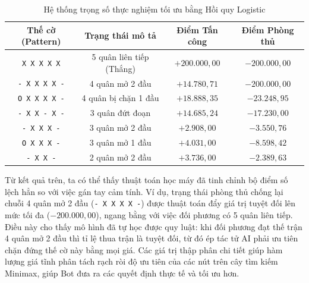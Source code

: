 \begin{table}[!htbp]
	\centering
	\renewcommand{\arraystretch}{1.25}
	\caption{Hệ thống trọng số thực nghiệm tối ưu bằng Hồi quy Logistic}
	\label{tab:weights_logistic}
	\begin{tabular}{|c|c|c|c|}
		\hline
		\textbf{Thế cờ (Pattern)} & \textbf{Trạng thái mô tả} & \textbf{Điểm Tấn công} & \textbf{Điểm Phòng thủ} \\ \hline
		\texttt{X X X X X} & 5 quân liên tiếp (Thắng) & $+200.000,00$ & $-200.000,00$ \\ \hline
		\texttt{- X X X X -} & 4 quân mở 2 đầu & $+14.780,71$ & $-200.000,00$ \\ \hline
		\texttt{O X X X X -} & 4 quân bị chặn 1 đầu & $+18.888,35$ & $-23.248,95$ \\ \hline
		\texttt{- X X - X -} & 3 quân đứt đoạn & $+14.685,24$ & $-17.230,00$ \\ \hline
		\texttt{- X X X -} & 3 quân mở 2 đầu & $+2.908,00$ & $-3.550,76$ \\ \hline
		\texttt{O X X X -} & 3 quân mở 1 đầu & $+4.031,00$ & $-8.598,42$ \\ \hline
		\texttt{- X X -} & 2 quân mở 2 đầu & $+3.736,00$ & $-2.389,63$ \\ \hline
	\end{tabular}
\end{table}
Từ kết quả trên, ta có thể thấy thuật toán học máy đã tinh chỉnh bộ điểm số lệch hẳn so với việc gán tay cảm tính. Ví dụ, trạng thái phòng thủ chống lại chuỗi 4 quân mở 2 đầu (\texttt{- X X X X -}) được thuật toán đẩy giá trị tuyệt đối lên mức tối đa ($-200.000,00$), ngang bằng với việc đối phương có 5 quân liên tiếp. Điều này cho thấy mô hình đã tự học được quy luật: khi đối phương đạt thế trận 4 quân mở 2 đầu thì tỉ lệ thua trận là tuyệt đối, từ đó ép tác tử AI phải ưu tiên chặn đứng thế cờ này bằng mọi giá. Các giá trị thập phân chi tiết giúp hàm lượng giá tĩnh phân tách rạch ròi độ ưu tiên của các nút trên cây tìm kiếm Minimax, giúp Bot đưa ra các quyết định thực tế và tối ưu hơn.